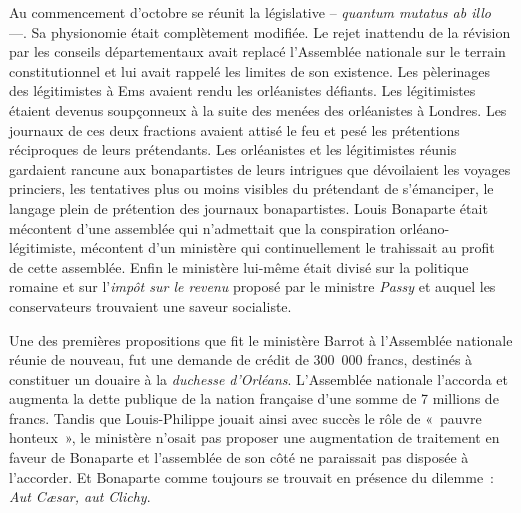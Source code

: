 \documentclass[twoside]{book} %
\begin{document}
Au commencement d’octobre se réunit la législative – \emph{quantum mutatus ab illo} —. Sa physionomie était complètement modifiée. Le rejet inattendu de la révision par les conseils départementaux avait replacé l’Assemblée nationale sur le terrain constitutionnel et lui avait rappelé les limites de son existence. Les pèlerinages des légitimistes à Ems avaient rendu les orléanistes défiants. Les légitimistes étaient devenus soupçonneux à la suite des menées des orléanistes à Londres. Les journaux de ces deux fractions avaient attisé le feu et pesé les prétentions réciproques de leurs prétendants. Les orléanistes et les légitimistes réunis gardaient rancune aux bonapartistes de leurs intrigues que dévoilaient les voyages princiers, les tentatives plus ou moins visibles du prétendant de s’émanciper, le langage plein de prétention des journaux bonapartistes. Louis Bonaparte était mécontent d’une assemblée qui n’admettait que la conspiration orléano-légitimiste, mécontent d’un ministère qui continuellement le trahissait au profit de cette assemblée. Enfin le ministère lui-même était divisé sur la politique romaine et sur l’\emph{impôt sur le revenu} proposé par le ministre \emph{Passy} et auquel les conservateurs trouvaient une saveur socialiste.\par
Une des premières propositions que fit le ministère Barrot à l’Assemblée nationale réunie de nouveau, fut une demande de crédit de 300 000 francs, destinés à constituer un douaire à la \emph{duchesse d’Orléans}. L’Assemblée nationale l’accorda et augmenta la dette publique de la nation française d’une somme de 7 millions de francs. Tandis que Louis-Philippe jouait ainsi avec succès le rôle de « pauvre honteux », le ministère n’osait pas proposer une augmentation de traitement en faveur de Bonaparte et l’assemblée de son côté ne paraissait pas disposée à l’accorder. Et Bonaparte comme toujours se trouvait en présence du dilemme : \emph{Aut Cæsar, aut Clichy}.\par
\end{document}

